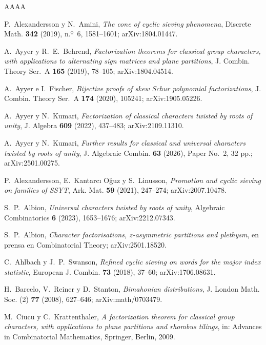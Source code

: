 \documentclass[11pt,reqno]{amsart}
\theoremstyle{plain}
\theoremstyle{definition}
\begin{document}
\begin{thebibliography}{AAAA}

 P.~Alexandersson y N.~Amini, \emph{The cone of cyclic sieving
phenomena}, Discrete Math. \textbf{342} (2019), n.º~6, 1581--1601; arXiv:1804.01447.

 A.~Ayyer y R.~E.~Behrend, \emph{Factorization theorems for classical group
characters, with applications to alternating sign matrices and plane partitions}, J. Combin. Theory
Ser.~A \textbf{165} (2019), 78--105; arXiv:1804.04514.

 A.~Ayyer e I.~Fischer, \emph{Bijective proofs of skew Schur polynomial
factorizations}, J. Combin. Theory Ser.~A \textbf{174} (2020), 105241; arXiv:1905.05226.

 A.~Ayyer y N.~Kumari, \emph{Factorization of classical characters twisted by
roots of unity}, J. Algebra \textbf{609} (2022), 437--483; arXiv:2109.11310.

 A.~Ayyer y N.~Kumari, \emph{Further results for classical and universal
characters twisted by roots of unity}, J. Algebraic Combin. \textbf{63} (2026), Paper No.~2, 32 pp.;
arXiv:2501.00275.

 P.~Alexandersson, E.~Kantarc\i{} O\u{g}uz y S.~Linusson, \emph{Promotion and
cyclic sieving on families of SSYT}, Ark. Mat. \textbf{59} (2021), 247--274; arXiv:2007.10478.

 S.~P.~Albion, \emph{Universal characters twisted by roots of unity},
Algebraic Combinatorics \textbf{6} (2023), 1653--1676; arXiv:2212.07343.

 S.~P.~Albion, \emph{Character factorisations, $z$-asymmetric partitions and
plethysm}, en prensa en Combinatorial Theory; arXiv:2501.18520.

 C.~Ahlbach y J.~P.~Swanson, \emph{Refined cyclic sieving on words for the
major index statistic}, European J. Combin. \textbf{73} (2018), 37--60; arXiv:1706.08631.

 H.~Barcelo, V.~Reiner y D.~Stanton, \emph{Bimahonian distributions},
J. London Math. Soc. (2) \textbf{77} (2008), 627--646; arXiv:math/0703479.

 M.~Ciucu y C.~Krattenthaler, \emph{A factorization theorem for classical
group characters, with applications to plane partitions and rhombus tilings}, in: Advances in
Combinatorial Mathematics, Springer, Berlin, 2009.


\end{thebibliography}
\end{document}
